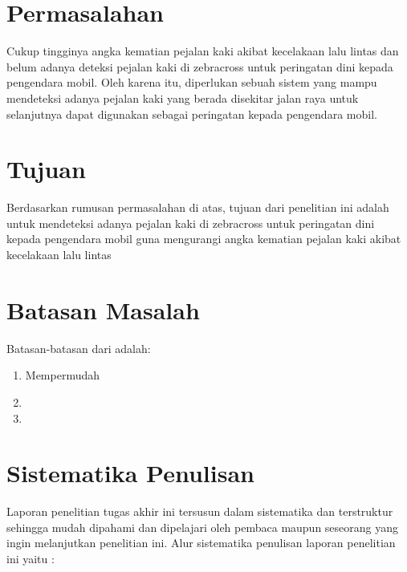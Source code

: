 \section{Permasalahan}
\label{sec:permasalahan}

Cukup tingginya angka kematian pejalan kaki akibat kecelakaan lalu lintas dan belum adanya deteksi pejalan kaki di zebracross untuk peringatan dini kepada pengendara mobil. Oleh karena itu, diperlukan sebuah sistem yang mampu mendeteksi adanya pejalan kaki yang berada disekitar jalan raya untuk selanjutnya dapat digunakan sebagai peringatan kepada pengendara mobil.

\section{Tujuan}
\label{sec:Tujuan}

Berdasarkan rumusan permasalahan di atas, tujuan dari penelitian ini adalah untuk mendeteksi adanya pejalan kaki di zebracross untuk peringatan dini kepada pengendara mobil guna mengurangi angka kematian pejalan kaki akibat kecelakaan lalu lintas

\section{Batasan Masalah}
\label{sec:batasanmasalah}

Batasan-batasan dari \lipsum[1][1-3] adalah:

\begin{enumerate}[nolistsep]

  \item Mempermudah \lipsum[2][1-3]

  \item \lipsum[3][1-5]

  \item \lipsum[4][1-5]

\end{enumerate}

\section{Sistematika Penulisan}
\label{sec:sistematikapenulisan}

Laporan penelitian tugas akhir ini tersusun dalam sistematika dan terstruktur sehingga mudah dipahami dan dipelajari oleh pembaca maupun seseorang yang ingin melanjutkan penelitian ini. Alur sistematika penulisan laporan penelitian ini yaitu :

